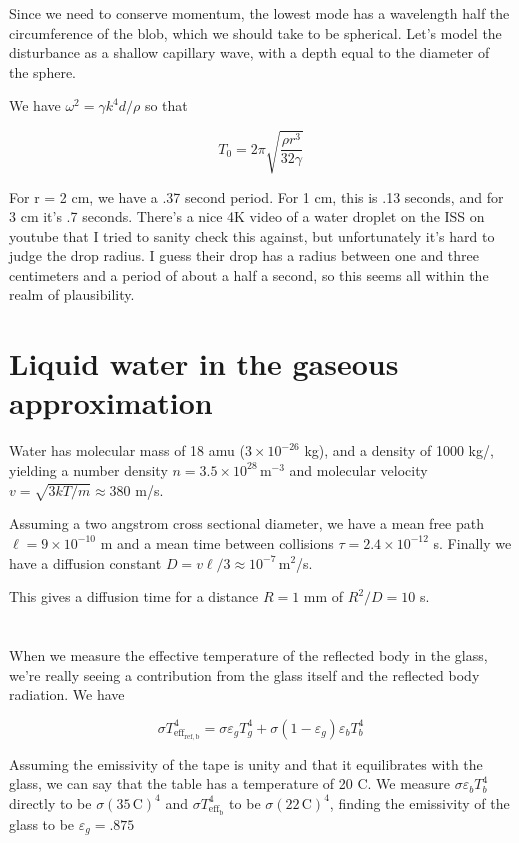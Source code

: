 \documentclass[12pt]{article}
\begin{document}
Since we need to conserve momentum, the lowest mode has a wavelength half the circumference of the blob, which we should take to be spherical. Let's model the disturbance as a shallow capillary wave, with a depth equal to the diameter of the sphere.

We have \( \omega^2 = \gamma k^4 d /\rho \) so that

\[ T_0 = 2\pi \sqrt{\frac{\rho r^3}{32 \gamma}}
\]

For r = 2 cm, we have a .37 second period. For 1 cm, this is .13 seconds, and for 3 cm it's .7 seconds. There's a nice 4K video of a water droplet on the ISS on youtube that I tried to sanity check this against, but unfortunately it's hard to judge the drop radius. I guess their drop has a radius between one and three centimeters and a period of about a half a second, so this seems all within the realm of plausibility.

\section{Liquid water in the gaseous approximation}

Water has molecular mass of 18 amu (\(3\times 10^{-26}\) kg), and a density of 1000 kg/\mcb, yielding a number density \(n = 3.5 \times 10^{28} \,\mathrm{m}^{-3}\) and molecular velocity \(v = \sqrt{3kT/m} \approx 380\) m/s.

Assuming a two angstrom cross sectional diameter, we have a mean free path \(\ell = 9\times 10^{-10}\) m and a mean time between collisions \(\tau = 2.4 \times 10^{-12}\) s. Finally we have a diffusion constant \(D = v\ell /3 \approx 10^{-7} \,\mathrm{m^2}\)/s.

This gives a diffusion time for a distance \(R = 1\) mm of \(R^2/D = 10\) s.  

\section{}

When we measure the effective temperature of the reflected body in the glass, we're really seeing a contribution from the glass itself and the reflected body radiation. We have

\[ \sigma T_{\mathrm{eff_{ref,b}}}^4 = \sigma\varepsilon_gT_g^4+\sigma(1-\varepsilon_g)\varepsilon_b T_b^4
\]

Assuming the emissivity of the tape is unity and that it equilibrates with the glass, we can say that the table has a temperature of 20 C. We measure \(\sigma\varepsilon_bT_b^4\) directly to be \(\sigma (35\, \mathrm{C})^4\) and \(\sigma T_{\mathrm{eff_b}}^4\) to be \(\sigma (22\, \mathrm{C})^4\), finding the emissivity of the glass to be \(\varepsilon_g = .875\)
\end{document}
